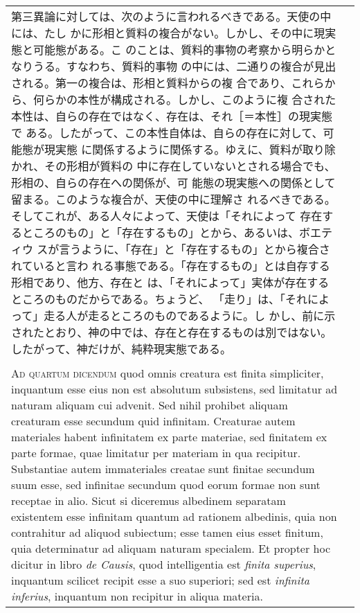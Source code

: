 \documentclass[10pt]{jsarticle} %
\begin{document}
\begin{longtable}{p{21em}p{21em}}
 第三異論に対しては、次のように言われるべきである。天使の中には、たし
 かに形相と質料の複合がない。しかし、その中に現実態と可能態がある。こ
 のことは、質料的事物の考察から明らかとなりうる。すなわち、質料的事物
 の中には、二通りの複合が見出される。第一の複合は、形相と質料からの複
 合であり、これらから、何らかの本性が構成される。しかし、このように複
 合された本性は、自らの存在ではなく、存在は、それ［＝本性］の現実態で
 ある。したがって、この本性自体は、自らの存在に対して、可能態が現実態
 に関係するように関係する。ゆえに、質料が取り除かれ、その形相が質料の
 中に存在していないとされる場合でも、形相の、自らの存在への関係が、可
 能態の現実態への関係として留まる。このような複合が、天使の中に理解さ
 れるべきである。そしてこれが、ある人々によって、天使は「それによって
 存在するところのもの」と「存在するもの」とから、あるいは、ボエティウ
 スが言うように、「存在」と「存在するもの」とから複合されていると言わ
 れる事態である。「存在するもの」とは自存する形相であり、他方、存在と
 は、「それによって」実体が存在するところのものだからである。ちょうど、
 「走り」は、「それによって」走る人が走るところのものであるように。し
 かし、前に示されたとおり、神の中では、存在と存在するものは別ではない。
 したがって、神だけが、純粋現実態である。

 \\\\
 
 {\scshape Ad quartum dicendum} quod omnis creatura est finita
 simpliciter, inquantum esse eius non est absolutum subsistens, sed
 limitatur ad naturam aliquam cui advenit. Sed nihil prohibet aliquam
 creaturam esse secundum quid infinitam. Creaturae autem materiales
 habent infinitatem ex parte materiae, sed finitatem ex parte formae,
 quae limitatur per materiam in qua recipitur. Substantiae autem
 immateriales creatae sunt finitae secundum suum esse, sed infinitae
 secundum quod eorum formae non sunt receptae in alio. Sicut si
 diceremus albedinem separatam existentem esse infinitam quantum ad
 rationem albedinis, quia non contrahitur ad aliquod subiectum; esse
 tamen eius esset finitum, quia determinatur ad aliquam naturam
 specialem. Et propter hoc dicitur in libro {\itshape de Causis}, quod
 intelligentia est {\itshape finita superius}, inquantum scilicet
 recipit esse a suo superiori; sed est {\itshape infinita inferius},
 inquantum non recipitur in aliqua materia.

 &


\end{longtable}
\end{document}

